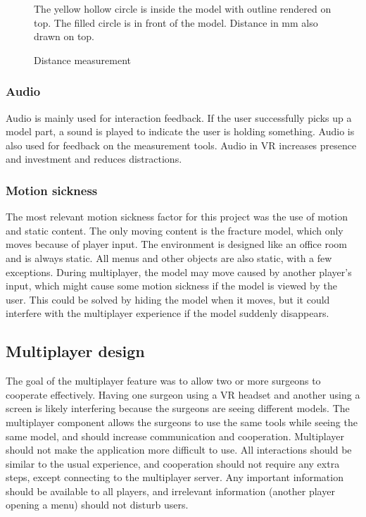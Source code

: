 \documentclass[a4paper]{report}
\begin{document}
\begin{figure}[h!]
    \centering
	\hfill
	\caption{Distance measurement}\label{measure}
  \small
  The yellow hollow circle is inside the model with outline rendered on top. The filled circle is in front of the model. Distance in mm also drawn on top.
~\cite{mishra_virtual_2019}
\end{figure}

\subsubsection{Audio}
Audio is mainly used for interaction feedback. If the user successfully picks up a model part, a sound is played to indicate the user is holding something. Audio is also used for feedback on the measurement tools. Audio in VR increases presence and investment and reduces distractions\cite{kern_audio_2020}.

\subsubsection{Motion sickness}
The most relevant motion sickness factor for this project was the use of motion and static content. The only moving content is the fracture model, which only moves because of player input. The environment is designed like an office room and is always static. All menus and other objects are also static, with a few exceptions.
During multiplayer, the model may move caused by another player's input, which might cause some motion sickness if the model is viewed by the user. This could be solved by hiding the model when it moves, but it could interfere with the multiplayer experience if the model suddenly disappears.

\subsection{Multiplayer design}
The goal of the multiplayer feature was to allow two or more surgeons to cooperate effectively. Having one surgeon using a VR headset and another using a screen is likely interfering because the surgeons are seeing different models. The multiplayer component allows the surgeons to use the same tools while seeing the same model, and should increase communication and cooperation.
Multiplayer should not make the application more difficult to use. All interactions should be similar to the usual experience, and cooperation should not require any extra steps, except connecting to the multiplayer server. Any important information should be available to all players, and irrelevant information (another player opening a menu) should not disturb users.
\end{document}
